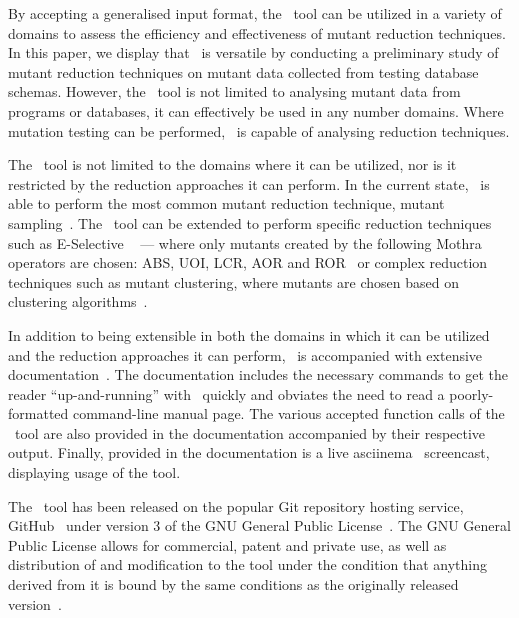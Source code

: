 By accepting a generalised input format, the \mr~tool can be utilized in a variety of domains to assess the efficiency
and effectiveness of mutant reduction techniques.  In this paper, we display that \mr~is versatile by conducting a
preliminary study of mutant reduction techniques on mutant data collected from testing database schemas.  However, the
\mr~tool is not limited to analysing mutant data from programs or databases, it can effectively be used in any number
domains. Where mutation testing can be performed, \mr~is capable of analysing reduction techniques.




The \mr~tool is not limited to the domains where it can be utilized, nor is it restricted
by the reduction approaches it can perform. In the current state, \mr~is able to perform
the most common mutant reduction technique, mutant sampling~\cite{gopinath2015mutation, jia2011analysis, gopinath2015empirical}.
The \mr~tool can be extended to perform specific reduction techniques such as E-Selective
~\cite{offutt1996experimental} --- where only mutants created by the following Mothra operators
are chosen: ABS, UOI, LCR, AOR and ROR~\cite{gopinath2015empirical} or complex reduction techniques
such as mutant clustering, where mutants are chosen based on clustering algorithms~\cite{jia2011analysis}.

In addition to being extensible in both the domains in which it can be utilized and the
reduction approaches it can perform, \mr~is accompanied with extensive documentation~\cite{tool}.
The documentation includes the necessary commands to get the reader ``up-and-running''
with \mr~quickly and obviates the need to read a poorly-formatted command-line manual page.
The various accepted function calls of the \mr~tool are also provided in the documentation
accompanied by their respective output. Finally, provided in the documentation is a live
asciinema~\cite{asciinema} screencast, displaying usage of the tool.

The \mr~tool has been released on the popular Git repository hosting service, GitHub~\cite{github}
under version 3 of the GNU General Public License~\cite{license}. The GNU General Public License
allows for commercial, patent and private use, as well as distribution of and modification to the tool
under the condition that anything derived from it is bound by the same conditions as the originally
released version~\cite{copyleft}.

% 
% 
% 
